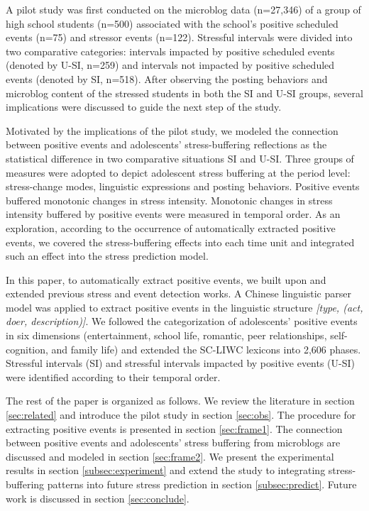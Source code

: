 \documentclass[5p,times,numbers,authoryear]{elsarticle}
\begin{document}
A pilot study was first conducted on the microblog data (n=27,346) of a group of high school students (n=500) associated with the school's positive scheduled events (n=75) and stressor events (n=122).
Stressful intervals were divided into two comparative categories:
intervals impacted by positive scheduled events (denoted by U-SI, n=259)
and intervals not impacted by positive scheduled events (denoted by SI, n=518).
After observing the posting behaviors and microblog content of the stressed students in both the SI and U-SI groups, several implications were discussed to guide the next step of the study.

Motivated by the implications of the pilot study, we modeled the connection between positive events and adolescents' stress-buffering reflections as the statistical difference in two comparative situations SI and U-SI.
Three groups of measures were adopted to depict adolescent stress buffering at the period level:
stress-change modes, linguistic expressions and posting behaviors.
Positive events buffered monotonic changes in stress intensity.
Monotonic changes in stress intensity buffered by positive events were measured in temporal order.
As an exploration, according to the occurrence of automatically extracted positive events,
we covered the stress-buffering effects into each time unit and integrated such an effect into the stress prediction model.

In this paper, to automatically extract positive events, we built upon and extended previous stress and event detection works. A Chinese linguistic parser model was applied to extract positive events in the linguistic structure
\emph{[type, (act, doer, description)]}.
We followed the categorization of adolescents' positive events in six dimensions (entertainment, school life, romantic, peer relationships, self-cognition, and family life) and extended the 
SC-LIWC 
lexicons into 2,606 phases.
Stressful intervals (SI) and stressful intervals impacted by positive events (U-SI) were identified according to their temporal order.

The rest of the paper is organized as follows.
We review the literature in section \ref{sec:related} and introduce the pilot study in section \ref{sec:obs}.
The procedure for extracting positive events is presented in section \ref{sec:frame1}.
The connection between positive events and adolescents' stress buffering from microblogs are discussed and modeled in section \ref{sec:frame2}.
We present the experimental results in section \ref{subsec:experiment}
and extend the study to integrating stress-buffering patterns into future stress prediction in section \ref{subsec:predict}.
Future work is discussed in section \ref{sec:conclude}.
\end{document}
